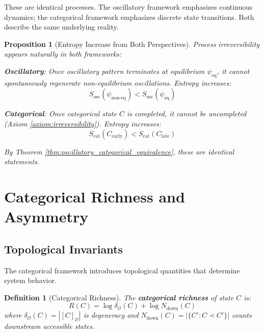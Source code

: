 \documentclass[12pt,a4paper]{article}
\newtheorem{definition}{Definition}
\newtheorem{proposition}{Proposition}
\begin{document}
These are identical processes. The oscillatory framework emphasizes continuous dynamics; the categorical framework emphasizes discrete state transitions. Both describe the same underlying reality.

\begin{proposition}[Entropy Increase from Both Perspectives]
\label{prop:entropy_increase_unified}
Process irreversibility appears naturally in both frameworks:

\textbf{Oscillatory}: Once oscillatory pattern terminates at equilibrium $\psi_{\text{eq}}$, it cannot spontaneously regenerate non-equilibrium oscillations. Entropy increases:
\begin{equation}
S_{\text{osc}}(\psi_{\text{non-eq}}) < S_{\text{osc}}(\psi_{\text{eq}})
\end{equation}

\textbf{Categorical}: Once categorical state $C$ is completed, it cannot be uncompleted (Axiom \ref{axiom:irreversibility}). Entropy increases:
\begin{equation}
S_{\text{cat}}(C_{\text{early}}) < S_{\text{cat}}(C_{\text{late}})
\end{equation}

By Theorem \ref{thm:oscillatory_categorical_equivalence}, these are identical statements.
\end{proposition}

\section{Categorical Richness and Asymmetry}

\subsection{Topological Invariants}

The categorical framework introduces topological quantities that determine system behavior.

\begin{definition}[Categorical Richness]
\label{def:richness}
The \textbf{categorical richness} of state $C$ is:
\begin{equation}
R(C) = \log \delta_{\mathcal{O}}(C) + \log N_{\text{down}}(C)
\end{equation}
where $\delta_{\mathcal{O}}(C) = |[C]_{\mathcal{O}}|$ is degeneracy and $N_{\text{down}}(C) = |\{C' : C \prec C'\}|$ counts downstream accessible states.
\end{definition}
\end{document}
